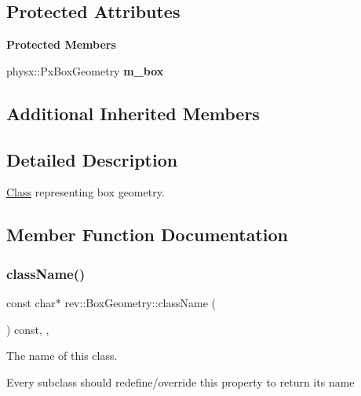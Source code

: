 \subsection*{Protected Attributes}
\begin{Indent}\textbf{ Protected Members}\par
\begin{DoxyCompactItemize}
\item 
\mbox{\label{classrev_1_1_box_geometry_a414d0f986d2647fe5db52c4daa97a1f8}} 
physx\+::\+Px\+Box\+Geometry {\bfseries m\+\_\+box}
\end{DoxyCompactItemize}
\end{Indent}
\subsection*{Additional Inherited Members}


\subsection{Detailed Description}
\mbox{\hyperlink{struct_class}{Class}} representing box geometry. 

\subsection{Member Function Documentation}
\mbox{\label{classrev_1_1_box_geometry_a2e815ff8c55805fdbb74eedf7b2c16c5}} 
\subsubsection{\texorpdfstring{className()}{className()}}
{\footnotesize\ttfamily const char$\ast$ rev\+::\+Box\+Geometry\+::class\+Name (\begin{DoxyParamCaption}{ }\end{DoxyParamCaption}) const\hspace{0.3cm}{\ttfamily [inline]}, {\ttfamily [override]}, {\ttfamily [virtual]}}



The name of this class. 

Every subclass should redefine/override this property to return its name 

